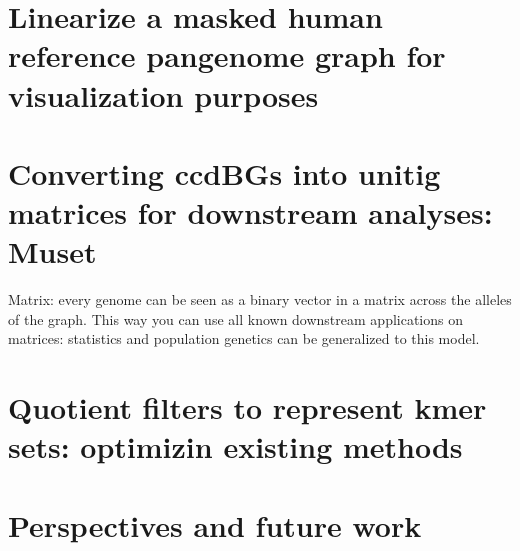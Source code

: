 \section{Linearize a masked human reference pangenome graph for visualization purposes}

\section{Converting ccdBGs into unitig matrices for downstream analyses: Muset}
Matrix: every genome can be seen as a binary vector in a matrix across the alleles of the graph. This way you can use all known downstream applications on matrices: statistics and population genetics can be generalized to this model.



\section{Quotient filters to represent kmer sets: optimizin existing methods}

\section{Perspectives and future work}

